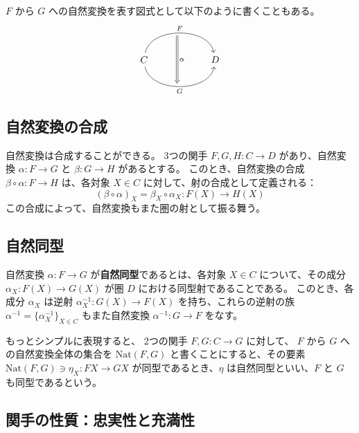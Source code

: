 \documentclass[uplatex,a4j,12pt,dvipdfmx]{jsarticle}
\begin{document}
$F$ から $G$ への自然変換を表す図式として以下のように書くこともある。
\[
	\begin{tikzcd}
		& {} \arrow[dd, "\alpha", Rightarrow, shift right] &   \\
		C \arrow[rr, "F", bend left=80] \arrow[rr, "G"', bend right=80] &                                                  & D \\
		& {}                                               &
	\end{tikzcd}
\]

\subsection{自然変換の合成}
自然変換は合成することができる。
3つの関手 $F, G, H: C \to D$ があり、自然変換 $\alpha: F \to G$ と $\beta: G \to H$ があるとする。
このとき、自然変換の合成 $\beta \circ \alpha: F \to H$ は、各対象 $X \in C$ に対して、射の合成として定義される：
$$
	(\beta \circ \alpha)_X = \beta_X \circ \alpha_X: F(X) \to H(X)
$$
この合成によって、自然変換もまた圏の射として振る舞う。

\subsection{自然同型}
自然変換 $\alpha: F \to G$ が\textbf{自然同型}であるとは、各対象 $X \in C$ について、その成分 $\alpha_X: F(X) \to G(X)$ が圏 $D$ における同型射であることである。
このとき、各成分 $\alpha_X$ は逆射 $\alpha_X^{-1}: G(X) \to F(X)$ を持ち、これらの逆射の族 $\alpha^{-1} = \{\alpha_X^{-1}\}_{X \in C}$ もまた自然変換 $\alpha^{-1}: G \to F$ をなす。

もっとシンプルに表現すると、
2つの関手 $F,G: C \to G$ に対して、 $F$ から $G$ への自然変換全体の集合を
$\text{Nat}(F,G)$
と書くことにすると、その要素 $\text{Nat}(F,G) \ni \eta_{X} : FX \to GX$ が同型であるとき、$\eta$ は自然同型といい、$F$ と $G$ も同型であるという。




\subsection{関手の性質：忠実性と充満性}
\end{document}
